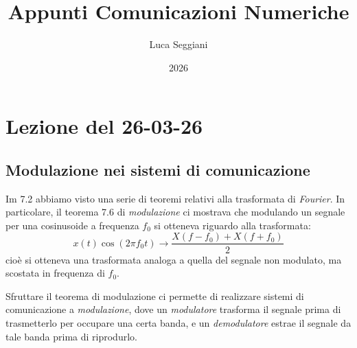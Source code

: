 \documentclass[a4paper,11pt]{article}
\title{Appunti Comunicazioni Numeriche}
\author{Luca Seggiani}
\date{2026}
\begin{document}
\section{Lezione del 26-03-26}

\thispagestyle{empty}
\pagestyle{fancy}

\subsection{Modulazione nei sistemi di comunicazione}
Im 7.2 abbiamo visto una serie di teoremi relativi alla trasformata di \textit{Fourier}. In particolare, il teorema 7.6 di \textit{modulazione} ci mostrava che modulando un segnale per una cosinusoide a frequenza $f_0$ si otteneva riguardo alla trasformata:
$$
x(t) \cos(2 \pi f_0 t) \rightarrow \frac{X(f - f_0) + X(f + f_0)}{2}
$$
cioè si otteneva una trasformata analoga a quella del segnale non modulato, ma scostata in frequenza di $f_0$.

Sfruttare il teorema di modulazione ci permette di realizzare sistemi di comunicazione a \textit{modulazione}, dove un \textit{modulatore} trasforma il segnale prima di trasmetterlo per occupare una certa banda, e un \textit{demodulatore} estrae il segnale da tale banda prima di riprodurlo.
\end{document}
